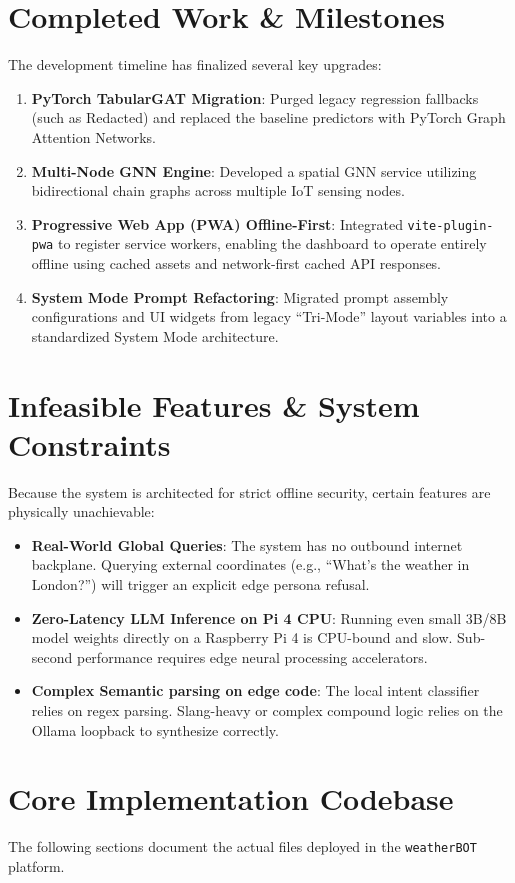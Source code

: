 \documentclass[12pt]{article}
\begin{document}
\section{Completed Work \& Milestones}
The development timeline has finalized several key upgrades:
\begin{enumerate}
    \item \textbf{PyTorch TabularGAT Migration}: Purged legacy regression fallbacks (such as Redacted) and replaced the baseline predictors with PyTorch Graph Attention Networks.
    \item \textbf{Multi-Node GNN Engine}: Developed a spatial GNN service utilizing bidirectional chain graphs across multiple IoT sensing nodes.
    \item \textbf{Progressive Web App (PWA) Offline-First}: Integrated \texttt{vite-plugin-pwa} to register service workers, enabling the dashboard to operate entirely offline using cached assets and network-first cached API responses.
    \item \textbf{System Mode Prompt Refactoring}: Migrated prompt assembly configurations and UI widgets from legacy ``Tri-Mode'' layout variables into a standardized System Mode architecture.
\end{enumerate}

\section{Infeasible Features \& System Constraints}
Because the system is architected for strict offline security, certain features are physically unachievable:
\begin{itemize}
    \item \textbf{Real-World Global Queries}: The system has no outbound internet backplane. Querying external coordinates (e.g., ``What's the weather in London?'') will trigger an explicit edge persona refusal.
    \item \textbf{Zero-Latency LLM Inference on Pi 4 CPU}: Running even small 3B/8B model weights directly on a Raspberry Pi 4 is CPU-bound and slow. Sub-second performance requires edge neural processing accelerators.
    \item \textbf{Complex Semantic parsing on edge code}: The local intent classifier relies on regex parsing. Slang-heavy or complex compound logic relies on the Ollama loopback to synthesize correctly.
\end{itemize}

\newpage
\section{Core Implementation Codebase}
The following sections document the actual files deployed in the \texttt{weatherBOT} platform.
\end{document}
